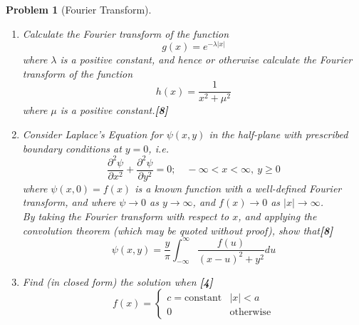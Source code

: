 \documentclass[a4paper]{article}
\theoremstyle{new}
\newtheorem{qns}{Problem}[section]
\begin{document}
\begin{qns}[Fourier Transform]\leavevmode
\begin{enumerate}[label=(\alph*)]
    \item Calculate the Fourier transform of the function
$$g(x)=e^{-\lambda|x|}$$
where $\lambda$ is a positive constant, and hence or otherwise calculate the Fourier transform of the function
$$h(x)=\frac{1}{x^2+\mu^2}$$
where $\mu$ is a positive constant.\hfill \textbf{[8]}
\item Consider Laplace's Equation for $\psi(x,y)$ in the half-plane with prescribed boundary conditions at $y=0$, i.e.
$$\frac{\partial^2\psi}{\partial x^2}+\frac{\partial^2\psi}{\partial y^2}=0;\quad -\infty<x<\infty,~y\geq0$$
where $\psi(x,0)=f(x)$ is a known function with a well-defined Fourier transform, and where $\psi\rightarrow0$ as $y\rightarrow\infty$, and $f(x)\rightarrow0$ as $|x|\rightarrow\infty$.\\[5pt]
By taking the Fourier transform with respect to $x$, and applying the convolution theorem (which may be quoted without proof), show that\hfill \textbf{[8]}
$$\psi(x,y)=\frac{y}{\pi}\int_{-\infty}^\infty\frac{f(u)}{(x-u)^2+y^2}du$$
\item Find (in closed form) the solution when \hfill \textbf{[4]}
$$f(x)=
\left\{
        \begin{array}{ll}
      c=\text{constant} & |x|<a \\
      0 & \text{otherwise}
        \end{array}
    \right.$$
\end{enumerate}
\end{qns}
\end{document}
